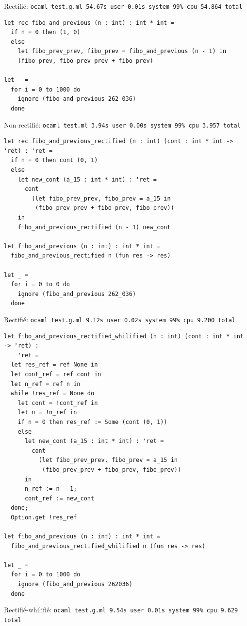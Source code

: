 Rectifié: \texttt{ocaml test.g.ml  54.67s user 0.01s system 99\% cpu 54.864 total}

\pagebreak

\begin{verbatim}
let rec fibo_and_previous (n : int) : int * int =
  if n = 0 then (1, 0)
  else
    let fibo_prev_prev, fibo_prev = fibo_and_previous (n - 1) in
    (fibo_prev, fibo_prev_prev + fibo_prev)

let _ =
  for i = 0 to 1000 do
    ignore (fibo_and_previous 262_036)
  done
\end{verbatim}

Non rectifié: \texttt{ocaml test.ml  3.94s user 0.00s system 99\% cpu 3.957 total}

\begin{verbatim}
let rec fibo_and_previous_rectified (n : int) (cont : int * int -> 'ret) : 'ret =
  if n = 0 then cont (0, 1)
  else
    let new_cont (a_15 : int * int) : 'ret =
      cont
        (let fibo_prev_prev, fibo_prev = a_15 in
         (fibo_prev_prev + fibo_prev, fibo_prev))
    in
    fibo_and_previous_rectified (n - 1) new_cont

let fibo_and_previous (n : int) : int * int =
  fibo_and_previous_rectified n (fun res -> res)

let _ =
  for i = 0 to 0 do
    ignore (fibo_and_previous 262_036)
  done
\end{verbatim}

Rectifié: \texttt{ocaml test.g.ml  9.12s user 0.02s system 99\% cpu 9.200 total}

\begin{verbatim}
let fibo_and_previous_rectified_whilified (n : int) (cont : int * int -> 'ret) :
    'ret =
  let res_ref = ref None in
  let cont_ref = ref cont in
  let n_ref = ref n in
  while !res_ref = None do
    let cont = !cont_ref in
    let n = !n_ref in
    if n = 0 then res_ref := Some (cont (0, 1))
    else
      let new_cont (a_15 : int * int) : 'ret =
        cont
          (let fibo_prev_prev, fibo_prev = a_15 in
           (fibo_prev_prev + fibo_prev, fibo_prev))
      in
      n_ref := n - 1;
      cont_ref := new_cont
  done;
  Option.get !res_ref

let fibo_and_previous (n : int) : int * int =
  fibo_and_previous_rectified_whilified n (fun res -> res)

let _ =
  for i = 0 to 1000 do
    ignore (fibo_and_previous 262036)
  done
\end{verbatim}

Rectifié-whilifié: \texttt{ocaml test.g.ml  9.54s user 0.01s system 99\% cpu 9.629 total}


